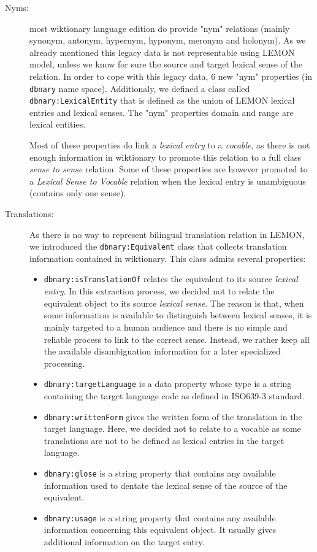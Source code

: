 \documentclass[sw]{iosart2c}
\begin{document}
\begin{description}
\item[Nyms:] most wiktionary language edition do provide "nym" relations (mainly synonym, antonym, hypernym, hyponym, meronym and holonym). As we already mentioned this legacy data is not representable using LEMON model, unless we know for sure the source and target lexical sense of the relation. In order to cope with this legacy data, 6 new "nym" properties (in \texttt{dbnary} name space). Additionaly, we defined a class called \texttt{dbnary:LexicalEntity} that is defined as the union of LEMON lexical entries and lexical senses. The "nym" properties domain and range are lexical entities. 

Most of these properties do link a \textit{lexical entry} to a \textit{vocable}, as there is not enough information in wiktionary to promote this relation to a full class \textit{sense to sense} relation. Some of these properties are however promoted to a \textit{Lexical Sense to Vocable} relation when the lexical entry is unambiguous (contains only one sense).
\item[Translations:] As there is no way to represent bilingual translation relation in LEMON, we introduced the \texttt{dbnary:Equivalent} class that collects translation information contained in wiktionary. This class admits several properties:
\begin{itemize}
\item \texttt{dbnary:isTranslationOf} relates the equivalent to its source \textit{lexical entry}. In this extraction process, we decided not to relate the equivalent object to its source \textit{lexical sense}. The reason is that, when some information is available to distinguish between lexical senses, it is mainly targeted to a human audience and there is no simple and reliable process to  link to the correct sense. Instead, we rather keep all the available disambiguation information for a later specialized processing.
\item \texttt{dbnary:targetLanguage} is a data property whose type is a string containing the target language code as defined in ISO639-3 standard.
\item \texttt{dbnary:writtenForm} gives the written form of the translation in the target language. Here, we decided not to relate to a vocable as some translations are not to be defined as lexical entries in the target language.
\item \texttt{dbnary:glose} is a string property that contains any available information used to dentate the lexical sense of the source of the equivalent.
\item \texttt{dbnary:usage} is a string property that contains any available information concerning this equivalent object. It usually gives additional information on the target entry.
\end{itemize}

\end{description}
\end{document}
